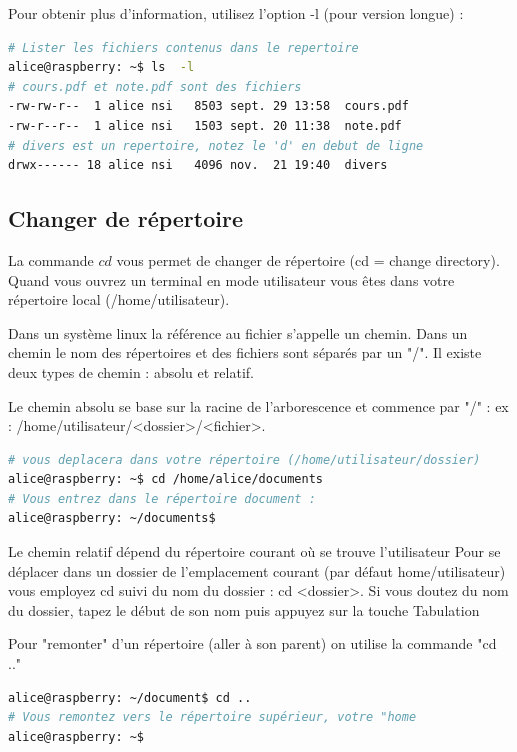 \documentclass[a4paper,12pt]{article}
\begin{document}
Pour obtenir plus d'information, utilisez l'option -l (pour version longue) :
\begin{lstlisting}[language=sh, frame = single]
# Lister les fichiers contenus dans le repertoire
alice@raspberry: ~$ ls  -l
# cours.pdf et note.pdf sont des fichiers
-rw-rw-r--  1 alice nsi   8503 sept. 29 13:58  cours.pdf
-rw-r--r--  1 alice nsi   1503 sept. 20 11:38  note.pdf
# divers est un repertoire, notez le 'd' en debut de ligne
drwx------ 18 alice nsi   4096 nov.  21 19:40  divers
\end{lstlisting}
\subsection{Changer de répertoire}
La commande $cd$ vous permet de changer de répertoire (cd = change directory). Quand vous ouvrez un terminal en mode utilisateur vous êtes dans votre répertoire local (/home/utilisateur).


Dans un système linux la référence au fichier s'appelle un chemin. Dans un chemin le nom des répertoires et des fichiers sont séparés par un "/". Il existe deux types de chemin : absolu et relatif.


Le chemin absolu se base sur la racine de l'arborescence et commence par "/" : ex : /home/utilisateur/<dossier>/<fichier>.
\begin{lstlisting}[language=sh, frame = single]
# vous deplacera dans votre répertoire (/home/utilisateur/dossier)
alice@raspberry: ~$ cd /home/alice/documents  
# Vous entrez dans le répertoire document :
alice@raspberry: ~/documents$   
\end{lstlisting}

Le chemin relatif dépend du répertoire courant où se trouve l'utilisateur Pour se déplacer dans un dossier de l'emplacement courant (par défaut home/utilisateur) vous employez cd suivi du nom du dossier : cd <dossier>. Si vous doutez du nom du dossier, tapez le début de son nom puis appuyez sur la touche Tabulation 

\bigskip
Pour "remonter" d'un répertoire (aller à son parent) on utilise la commande "cd .." 
\begin{lstlisting}[language=sh, frame = single]
alice@raspberry: ~/document$ cd ..  
# Vous remontez vers le répertoire supérieur, votre "home
alice@raspberry: ~$   
\end{lstlisting}
\end{document}

